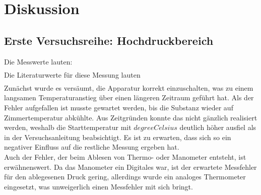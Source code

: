 \section{Diskussion}
\label{sec:Diskussion}
\subsection{Erste Versuchsreihe: Hochdruckbereich}
Die Messwerte lauten:
\begin{align*}

\end{align*}
Die Literaturwerte für diese Messung lauten 
\begin{align*}

\end{align*}
Zunächst wurde es versäumt, die Apparatur korrekt einzuschalten, was zu einem langsamen Temperaturanstieg über einen längeren Zeitraum geführt hat. Als der Fehler aufgefallen
ist musste gewartet werden, bis die Substanz wieder auf Zimmertemperatur abkühlte. Aus Zeitgründen konnte das nicht gänzlich realisiert werden, weshalb die Starttemperatur 
mit $ \si{degreeCelsius}$ deutlich höher ausfiel als in der Versuchsanleitung beabsichtigt. Es ist zu erwarten, dass sich so ein negativer Einfluss auf die restliche Messung
ergeben hat. \\
Auch der Fehler, der beim Ablesen von Thermo- oder Manometer entsteht, ist erwähnenswert. Da das Manometer ein Digitales war, ist der erwartete Messfehler für den ablegesenen 
Druck gering, allerdings wurde ein analoges Thermometer eingesetzt, was unweigerlich einen Messfehler mit sich bringt.

